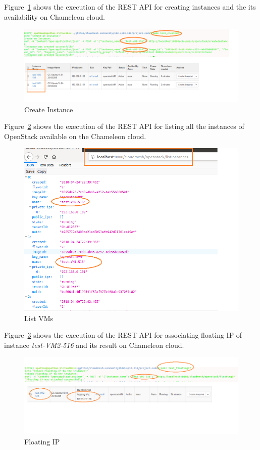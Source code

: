 Figure~\ref{fig:createVM} shows the execution of the REST API for creating
instances and the its availability on Chameleon cloud.

\begin{figure}[!ht]
        \centering\includegraphics[width=\columnwidth]{images/createVM.png}
        \caption{Create Instance}
        \label{fig:createVM}
\end{figure}

Figure~\ref{fig:listVM} shows the execution of the REST API for listing all the
instances of OpenStack available on the Chameleon cloud. 

\begin{figure}[!ht]
        \centering\includegraphics[width=\columnwidth]{images/listVMs.png}
        \caption{List VMs}
        \label{fig:listVM}
\end{figure}

Figure~\ref{fig:floatingIP} shows the execution of the REST API for associating
floating IP of instance \textit{test-VM2-516} and its result on Chameleon 
cloud.

\begin{figure}[!ht]
        \centering\includegraphics[width=\columnwidth]{images/floatingip.png}
        \caption{Floating IP}
        \label{fig:floatingIP}
\end{figure}

